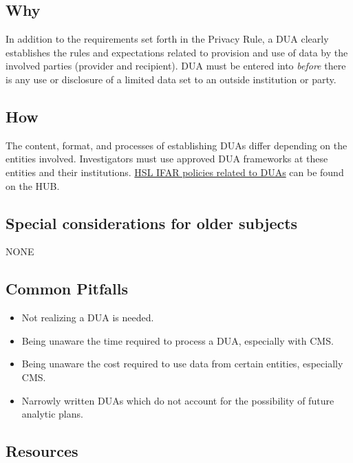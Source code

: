 \documentclass[]{book}
\providecommand{\tightlist}{%
  \setlength{\itemsep}{0pt}\setlength{\parskip}{0pt}}
\theoremstyle{definition}
\theoremstyle{definition}
\theoremstyle{definition}
\theoremstyle{remark}
\begin{document}
\subsection{Why}\label{why-7}

In addition to the requirements set forth in the Privacy Rule, a DUA
clearly establishes the rules and expectations related to provision and
use of data by the involved parties (provider and recipient). DUA must
be entered into \emph{before} there is any use or disclosure of a
limited data set to an outside institution or party.

\subsection{How}\label{how-7}

The content, format, and processes of establishing DUAs differ depending
on the entities involved. Investigators must use approved DUA frameworks
at these entities and their institutions.
\href{http://thehslhub/~/media/HSLNet/P_P/IFAR/IFARPPCMS.ashx}{HSL IFAR
policies related to DUAs} can be found on the HUB.

\subsection{Special considerations for older
subjects}\label{special-considerations-for-older-subjects-2}

NONE

\subsection{Common Pitfalls}\label{common-pitfalls-5}

\begin{itemize}
\tightlist
\item
  Not realizing a DUA is needed.
\item
  Being unaware the time required to process a DUA, especially with CMS.
\item
  Being unaware the cost required to use data from certain entities,
  especially CMS.
\item
  Narrowly written DUAs which do not account for the possibility of
  future analytic plans.
\end{itemize}

\subsection{Resources}\label{resources-6}
\end{document}
